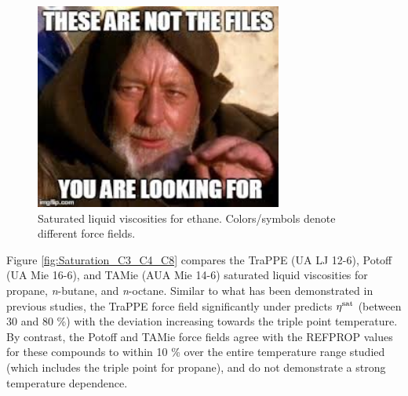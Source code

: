 \documentclass[preprint,review,12pt]{elsarticle}
\begin{document}
	
	\begin{figure}[p!]
		\centering
		\includegraphics[width=3.2in]{empty_figure.jpg}
		\caption{Saturated liquid viscosities for ethane. Colors/symbols denote different force fields.}
		\label{fig:Saturation_Ethane}
	\end{figure} 
	
	Figure \ref{fig:Saturation_C3_C4_C8} compares the TraPPE (UA LJ 12-6), Potoff (UA Mie 16-6), and TAMie (AUA Mie 14-6) saturated liquid viscosities for propane, \textit{n}-butane, and \textit{n}-octane. Similar to what has been demonstrated in previous studies, the TraPPE force field significantly under predicts $\eta^{\rm sat}$ (between 30 and 80 \%) with the deviation increasing towards the triple point temperature. By contrast, the Potoff and TAMie force fields agree with the REFPROP values for these compounds to within 10 \% over the entire temperature range studied (which includes the triple point for propane), and do not demonstrate a strong temperature dependence.  
	
\end{document}
